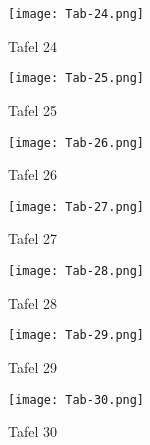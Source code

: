 \documentclass[a4paper, 11pt, oneside, german]{article}
\begin{document}
\clearpage
\begin{figure}[b]
\caption{Tafel 24}
\texttt{[image: Tab-24.png]}
\centering
\end{figure}
\clearpage
\begin{figure}[b]
\caption{Tafel 25}
\texttt{[image: Tab-25.png]}
\centering
\end{figure}
\clearpage
\begin{figure}[b]
\caption{Tafel 26}
\texttt{[image: Tab-26.png]}
\centering
\end{figure}
\clearpage
\begin{figure}[b]
\caption{Tafel 27}
\texttt{[image: Tab-27.png]}
\centering
\end{figure}
\clearpage
\begin{figure}[b]
\caption{Tafel 28}
\texttt{[image: Tab-28.png]}
\centering
\end{figure}
\clearpage
\begin{figure}[b]
\caption{Tafel 29}
\texttt{[image: Tab-29.png]}
\centering
\end{figure}
\clearpage
\begin{figure}[b]
\caption{Tafel 30}
\texttt{[image: Tab-30.png]}
\centering
\end{figure}
\clearpage
\printindex
\clearpage
\end{document}
